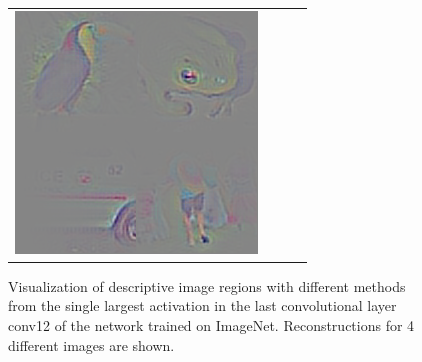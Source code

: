 \documentclass{article} %
\begin{document}
\begin{appendix}
\begin{figure}[h]
\begin{center}
\begin{tabular}{ >{\centering\arraybackslash} m{1.5cm} >{\centering\arraybackslash} m{3.5cm} >{\centering\arraybackslash} m{3.5cm} >{\centering\arraybackslash} m{3.5cm} }
  \includegraphics[width=.27\textwidth]{cccp8_tobi_stride.png} 
\end{tabular}
\end{center}
\caption{Visualization of descriptive image regions with different methods from the single largest activation in the last convolutional layer conv12 of the network trained on ImageNet. Reconstructions for 4 different images are shown.}
\label{fig:cccp8_different_methods}
\end{figure}


\end{appendix}
\end{document}
